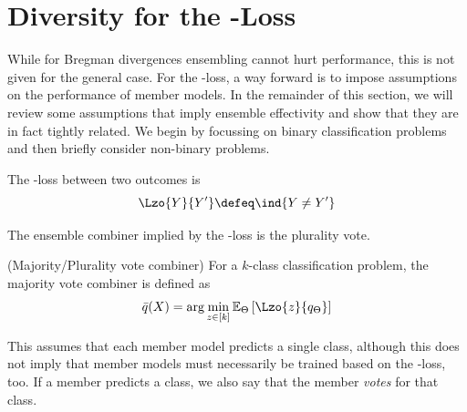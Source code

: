 \documentclass[../main.tex]{subfiles}
\begin{document}







\section{Diversity for the \zeroone-Loss}
\label{sec:diversity-zeroone}
While for Bregman divergences ensembling cannot hurt performance, this is not given for the general case. For the \zeroone-loss, a way forward is to impose assumptions on the performance of member models.
In the remainder of this section, we will review some assumptions that imply ensemble effectivity and show that they are in fact tightly related. We begin by focussing on binary classification problems and then briefly consider non-binary problems.


\begin{definition}
\label{def:zeroone-loss}
The \zeroone-loss between two outcomes is 
$$
\Lzo{Y}{Y'} \defeq \ind{Y \not= Y'}
$$
\end{definition}

The ensemble combiner implied by the \zeroone-loss is the plurality vote.
\begin{definition} 
   \label{def:majority-vote} 
    (Majority/Plurality vote combiner) For a $k$-class classification problem, the majority vote combiner is defined as
$$
\bar{q}(X) = \arg\min_{z \in [k]} \mathbb{E}_{\Theta}\left[ \Lzo{z}{q_{\Theta}} \right]  
$$
\end{definition}
This assumes that each member model predicts a single class, although this does not imply that member models must necessarily be trained based on the \zeroone-loss, too. If a member predicts a class, we also say that the member \textit{votes} for that class.
\end{document}

